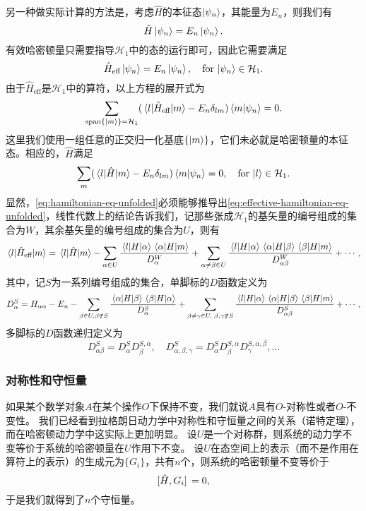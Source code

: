 \documentclass[UTF8, a4paper]{ctexart}
\begin{document}
另一种做实际计算的方法是，考虑$\hat{H}$的本征态$\ket{\psi_n}$，其能量为$E_n$，则我们有
\[
    \hat{H} \ket{\psi_n} = E_n \ket{\psi_n}.
\]
有效哈密顿量只需要指导$\mathcal{H}_1$中的态的运行即可，因此它需要满足
\[
    \hat{H}_\text{eff} \ket{\psi_n} = E_n \ket{\psi_n}, \quad \text{for $\ket{\psi_n} \in \mathcal{H}_1$}.
\]
由于$\hat{H}_\text{eff}$是$\mathcal{H}_1$中的算符，以上方程的展开式为
\begin{equation}
    \sum_{\text{span}\{\ket{m}\} = \mathcal{H}_1} (\mel{l}{\hat{H}_\text{eff}}{m} - E_n \delta_{lm}) \braket{m}{\psi_n} = 0.
    \label{eq:effective-hamiltonian-eq-unfolded}
\end{equation}
这里我们使用一组任意的正交归一化基底$\{\ket{m}\}$，它们未必就是哈密顿量的本征态。相应的，$\hat{H}$满足
\begin{equation}
    \sum_m (\mel{l}{\hat{H}}{m} - E_n \delta_{lm}) \braket{m}{\psi_n} = 0, \quad \text{for $\ket{l} \in \mathcal{H}_1$}.
    \label{eq:hamiltonian-eq-unfolded}
\end{equation}
显然，\eqref{eq:hamiltonian-eq-unfolded}必须能够推导出\eqref{eq:effective-hamiltonian-eq-unfolded}，线性代数上的结论告诉我们，记那些张成$\mathcal{H}_1$的基矢量的编号组成的集合为$W$，其余基矢量的编号组成的集合为$U$，则有
\[
    \mel{l}{\hat{H}_\text{eff}}{m} = \mel{l}{\hat{H}}{m} - \sum_{\alpha \in U} \frac{\mel{l}{H}{\alpha} \mel{\alpha}{H}{m}} {D_\alpha^W} + \sum_{\alpha \neq \beta \in U} \frac{\mel{l}{H}{\alpha} \mel{\alpha}{H}{\beta} \mel{\beta}{H}{m}}{D^W_{\alpha \beta}} + \cdots,
\]
其中，记$S$为一系列编号组成的集合，单脚标的$D$函数定义为
\[
    D_\alpha^S = H_{\alpha \alpha} - E_n - \sum_{\beta \in U, \beta \notin S} \frac{\mel{\alpha}{H}{\beta} \mel{\beta}{H}{\alpha}}{D_\alpha^S} + \sum_{\beta \neq \gamma \in U, \; \beta, \gamma \notin S} \frac{\mel{l}{H}{\alpha} \mel{\alpha}{H}{\beta} \mel{\beta}{H}{m}}{D_{\alpha \beta}^S} + \cdots,
\]
多脚标的$D$函数递归定义为
\[
    D_{\alpha \beta}^S = D_\alpha^S D_{\beta}^{S, \alpha}, \quad D_{\alpha, \beta, \gamma}^S = D_{\alpha}^S D_{\beta}^{S, \alpha} D_{\gamma}^{S, \alpha, \beta}, \ldots
\]

\subsubsection{对称性和守恒量}\label{sec:hamiltonian-symmetry}

如果某个数学对象$A$在某个操作$O$下保持不变，我们就说$A$具有$O$-对称性或者$O$-不变性。
我们已经看到拉格朗日动力学中对称性和守恒量之间的关系（诺特定理），而在哈密顿动力学中这实际上更加明显。
设$U$是一个对称群，则系统的动力学不变等价于系统的哈密顿量在$U$作用下不变。
设$U$在态空间上的表示（而不是作用在算符上的表示）的生成元为$\{G_i\}$，共有$n$个，则系统的哈密顿量不变等价于
\[
    \comm*{\hat{H}}{G_i} = 0,
\]
于是我们就得到了$n$个守恒量。
\end{document}
